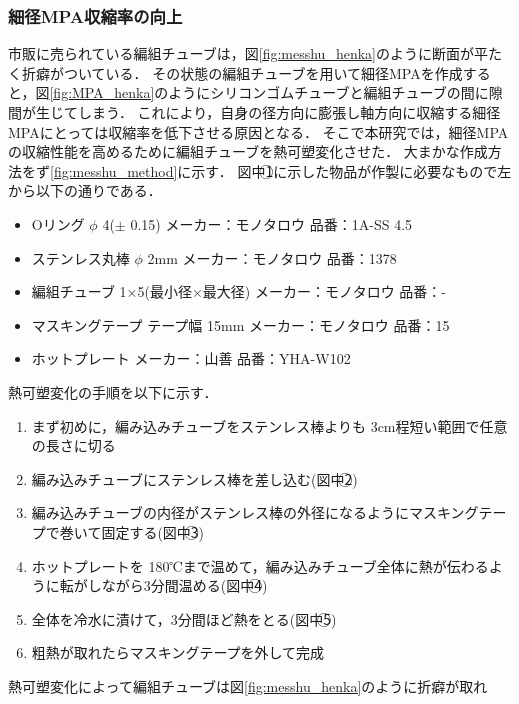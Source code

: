 \subsubsection{細径MPA収縮率の向上}
市販に売られている編組チューブは，図\ref{fig:messhu_henka}のように断面が平たく折癖がついている．
その状態の編組チューブを用いて細径MPAを作成すると，図\ref{fig:MPA_henka}のようにシリコンゴムチューブと編組チューブの間に隙間が生じてしまう．
これにより，自身の径方向に膨張し軸方向に収縮する細径MPAにとっては収縮率を低下させる原因となる．
そこで本研究では，細径MPAの収縮性能を高めるために編組チューブを熱可塑変化させた．
大まかな作成方法をず\ref{fig:messhu_method}に示す．
図中\textcircled{\scriptsize 1}に示した物品が作製に必要なもので左から以下の通りである．
%
\begin{itemize}
  \item Oリング $\phi$ 4($\pm$ 0.15) メーカー：モノタロウ 品番：1A-SS 4.5
  \item ステンレス丸棒 $\phi$ 2mm メーカー：モノタロウ 品番：1378
  \item 編組チューブ 1×5(最小径×最大径) メーカー：モノタロウ 品番：-
  \item マスキングテープ テープ幅 15mm メーカー：モノタロウ 品番：15
  \item ホットプレート メーカー：山善 品番：YHA-W102
\end{itemize}
%
熱可塑変化の手順を以下に示す．
\vspace{3mm}
\begin{enumerate}
  \item まず初めに，編み込みチューブをステンレス棒よりも 3cm程短い範囲で任意の長さに切る
  \item 編み込みチューブにステンレス棒を差し込む(図中\textcircled{\scriptsize 2})
  \item 編み込みチューブの内径がステンレス棒の外径になるようにマスキングテープで巻いて固定する(図中\textcircled{\scriptsize 3})
  \item ホットプレートを 180℃まで温めて，編み込みチューブ全体に熱が伝わるように転がしながら3分間温める(図中\textcircled{\scriptsize 4})
  \item 全体を冷水に漬けて，3分間ほど熱をとる(図中\textcircled{\scriptsize 5})
  \item 粗熱が取れたらマスキングテープを外して完成
\end{enumerate}
熱可塑変化によって編組チューブは図\ref{fig:messhu_henka}のように折癖が取れ
